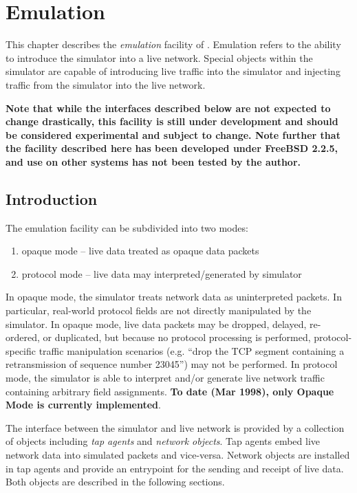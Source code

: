 \chapter{Emulation}
\label{sec:emulation}

This chapter describes the {\em emulation} facility
of \ns.
Emulation refers to the ability to introduce the
simulator into a live network.
Special objects within the simulator are capable
of introducing live traffic into the simulator and
injecting traffic from the simulator into the
live network.

{\bf Note that while the interfaces described below
are not expected to change drastically,
this facility is still under development and
should be considered experimental and subject to change.
Note further that the facility described here has been
developed under FreeBSD 2.2.5, and use on other systems
has not been tested by the author.
}

\section{Introduction}

The emulation facility can be subdivided into
two modes:
\begin{enumerate}
\item {\sf opaque mode} -- live data treated as opaque data packets
\item {\sf protocol mode} -- live data may interpreted/generated by simulator
\end{enumerate}
In opaque mode, the simulator
treats network data as uninterpreted packets.
In particular, real-world protocol fields
are not directly manipulated by the simulator.
In opaque mode, live data packets may be dropped, delayed, re-ordered, or
duplicated, but because no protocol processing is performed,
protocol-specific traffic manipulation scenarios (e.g. ``drop the TCP segment
containing a retransmission of sequence number 23045'') may not be performed.
In protocol mode, the simulator is able to interpret and/or generate
live network traffic containing arbitrary field assignments.
{\bf To date (Mar 1998), only Opaque Mode is currently implemented}.

The interface between the simulator and live network is provided by
a collection of objects including {\em tap agents} and {\em network objects}.
Tap agents embed live network data into simulated packets and
vice-versa.
Network objects are installed in tap agents and provide an entrypoint
for the sending and receipt of live data.
Both objects are described in the following sections.

